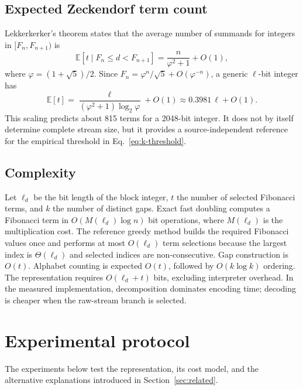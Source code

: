 \documentclass[a4paper,fleqn]{cas-dc}
\begin{document}
\subsection{Expected Zeckendorf term count}
\label{sec:expected-terms}

Lekkerkerker's theorem states that the average number of summands for
integers in $[F_n,F_{n+1})$ is \cite{Kologlu2011Summands}
\begin{equation}
\mathbb{E}[t\mid F_n\leq d<F_{n+1}]
=\frac{n}{\varphi^2+1}+O(1),
\label{eq:lekkerkerker}
\end{equation}
where $\varphi=(1+\sqrt{5})/2$. Since
$F_n=\varphi^n/\sqrt{5}+O(\varphi^{-n})$, a generic $\ell$-bit integer has
\begin{equation}
\mathbb{E}[t]
=\frac{\ell}{(\varphi^2+1)\log_2\varphi}+O(1)
\approx 0.3981\,\ell+O(1).
\label{eq:expected-terms}
\end{equation}
This scaling predicts about 815 terms for a 2048-bit integer. It does not by
itself determine complete stream size, but it provides a source-independent
reference for the empirical threshold in Eq.~\eqref{eq:k-threshold}.

\subsection{Complexity}

Let $\ell_d$ be the bit length of the block integer, $t$ the number of selected
Fibonacci terms, and $k$ the number of distinct gaps. Exact fast doubling
computes a Fibonacci term in $O(M(\ell_d)\log n)$ bit operations, where
$M(\ell_d)$ is
the multiplication cost. The reference greedy method builds the required
Fibonacci values once and performs at most $O(\ell_d)$ term selections because
the largest index is $\Theta(\ell_d)$ and selected indices are non-consecutive. Gap
construction is $O(t)$. Alphabet counting is expected $O(t)$, followed by
$O(k\log k)$ ordering. The representation requires $O(\ell_d+t)$ bits, excluding
interpreter overhead. In the measured implementation, decomposition dominates
encoding time; decoding is cheaper when the raw-stream branch is selected.

\section{Experimental protocol}
\label{sec:protocol}

The experiments below test the representation, its cost model, and the
alternative explanations introduced in Section~\ref{sec:related}.
\end{document}

